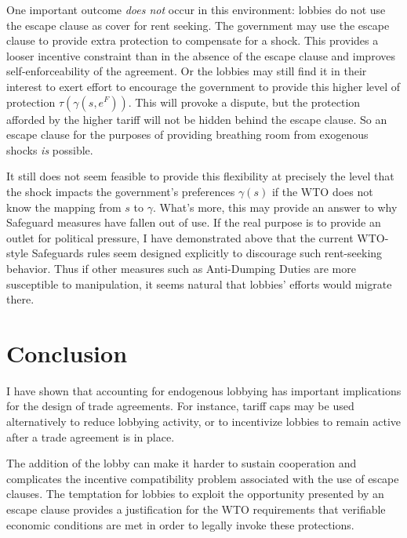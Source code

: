 \documentclass[12pt]{article}
\newcommand{\ga}{\gamma}
\begin{document}
One important outcome \textit{does not} occur in this environment: lobbies do not use the escape clause as cover for rent seeking. The government may use the escape clause to provide extra protection to compensate for a shock. This provides a looser incentive constraint than in the absence of the escape clause and improves self-enforceability of the agreement. Or the lobbies may still find it in their interest to exert effort to encourage the government to provide this higher level of protection $\tau(\ga(s,e^F))$. This will provoke a dispute, but the protection afforded by the higher tariff will not be hidden behind the escape clause. So an escape clause for the purposes of providing breathing room from exogenous shocks \textit{is} possible.

It still does not seem feasible to provide this flexibility at precisely the level that the shock impacts the government's preferences $\ga(s)$ if the WTO does not know the mapping from $s$ to $\ga$. What's more, this may provide an answer to why Safeguard measures have fallen out of use. If the real purpose is to provide an outlet for political pressure, I have demonstrated above that the current WTO-style Safeguards rules seem designed explicitly to discourage such rent-seeking behavior. Thus if other measures such as Anti-Dumping Duties are more susceptible to manipulation, it seems natural that lobbies' efforts would migrate there.

	


%

\section{Conclusion}
\label{sec:concl}
I have shown that accounting for endogenous lobbying has important implications for the design of trade agreements. For instance, tariff caps may be used alternatively to reduce lobbying activity, or to incentivize lobbies to remain active after a trade agreement is in place.

The addition of the lobby can make it harder to sustain cooperation and complicates the incentive compatibility problem associated with the use of escape clauses. The temptation for lobbies to exploit the opportunity presented by an escape clause provides a justification for the WTO requirements that verifiable economic conditions are met in order to legally invoke these protections.
\end{document}
